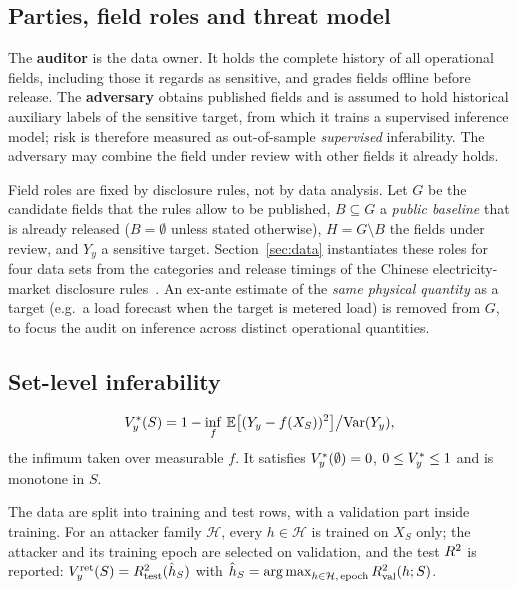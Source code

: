 \subsection{Parties, field roles and threat model}
The \textbf{auditor} is the data owner. It holds the complete history of all operational
fields, including those it regards as sensitive, and grades fields offline before release.
The \textbf{adversary} obtains published fields and is assumed to hold historical auxiliary
labels of the sensitive target, from which it trains a supervised inference model; risk is
therefore measured as out-of-sample \emph{supervised} inferability. The adversary may combine
the field under review with other fields it already holds.

Field roles are fixed by disclosure rules, not by data analysis. Let $G$ be the candidate
fields that the rules allow to be published, $B\subseteq G$ a \emph{public baseline} that is
already released ($B=\emptyset$ unless stated otherwise), $H=G\setminus B$ the fields under
review, and $Y_y$ a sensitive target. Section~\ref{sec:data} instantiates these roles for
four data sets from the categories and release timings of the Chinese electricity-market
disclosure rules~\cite{nea2024disclosure}. An ex-ante estimate of the \emph{same physical
quantity} as a target (e.g.\ a load forecast when the target is metered load) is removed from
$G$, to focus the audit on inference across distinct operational quantities.

\subsection{Set-level inferability}
\begin{definition}
\[
V_y^{*}(S) = 1 - \inf_{f}\,\mathbb{E}\big[(Y_y - f(X_S))^{2}\big] \big/ \mathrm{Var}(Y_y),
\]
the infimum taken over measurable $f$. It satisfies $V_y^{*}(\emptyset)=0$, $0 \le V_y^{*} \le 1$
and is monotone in $S$.
\end{definition}

\begin{definition}\label{def:vret}
The data are split into training and test rows, with a validation part inside training. For
an attacker family $\mathcal{H}$, every $h\in\mathcal{H}$ is trained on $X_S$ only; the
attacker and its training epoch are selected on validation, and the test $R^2$ is reported:
$V_y^{\mathrm{ret}}(S) = R^2_{\mathrm{test}}(\hat h_S)$ with
$\hat h_S = \operatorname*{arg\,max}_{h \in \mathcal{H},\,\mathrm{epoch}} R^2_{\mathrm{val}}(h;S)$.
\end{definition}

